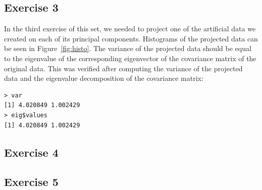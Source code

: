 \documentclass{article}
\begin{document}
\subsection{Exercise 3}
In the third exercise of this set, we needed to project one of the artificial
data we created on each of its principal components. Histograms of the
projected data can be seen in Figure~\ref{fig:histo}. The variance of
the projected data should be equal to the eigenvalue of the
corresponding eigenvector of the covariance matrix of the original
data. This was verified after computing the variance of the projected
data and the eigenvalue decomposition of the covariance matrix:
\begin{verbatim}
> var
[1] 4.020849 1.002429
> eig$values
[1] 4.020849 1.002429
\end{verbatim}
\subsection{Exercise 4}\label{sec:subsection4}
\subsection{Exercise 5}
\end{document}
